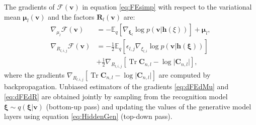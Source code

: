 \documentclass{article}
\newcommand{\E}{\mathbb{E}} %
\newcommand{\FE}{\mathcal{F}} %
\DeclareMathOperator{\Tr}{Tr} %
\newcommand{\hid}{\ensuremath{\mathbf{h}}} %
\newcommand{\vis}{\ensuremath{\mathbf{v}}} %
\newcommand{\myvec}[1]{\mbox{$\mathbf{#1}$}}
\newcommand{\myvecsym}[1]{\mbox{$\boldsymbol{#1}$}}
\newcommand{\vmu}{\mbox{$\myvecsym{\mu}$}}
\newcommand{\vxi}{\mbox{$\myvecsym{\xi}$}}
\newcommand{\vC}{\mbox{$\myvec{C}$}}
\newcommand{\vR}{\mbox{$\myvec{R}$}}
\begin{document}
\begin{bibunit}[icml2013]
The gradients of $\FE(\vis)$ in equation \eqref{eq:FEsimp} with 
respect to the variational mean $\vmu_l (\vis)$ and the factors 
$\vR_l(\vis)$ 
are:
\vspace{-2mm}
\begin{align}
\nabla_{\mu_l} \FE(\vis) 
&= -  \E_{q} \left[ \nabla_{\vxi_l} \log p(\vis| \hid(\xi) ) 
\right] + \vmu_l, \label{eq:dFEdMu} \\
\nabla_{R_{l,i,j}} \FE(\vis)
&= - \tfrac{1}{2}\E_{q} \left[ \epsilon_{l,j}
\nabla_{\xi_{l,i}} \log p(\vis| \hid(\vxi) ) 
\right] \nonumber\\
&+ \tfrac{1}{2}\nabla_{R_{l,i,j}}  \left[ \Tr \vC _{n,l}  - \log \vert \vC_{n,l} 
\vert \right], \label{eq:dFEdR}
\end{align}
where the gradients $\nabla_{R_{l,i,j}}  \left[ \Tr \vC _{n,l}  - \log \vert 
\vC_{n,l} 
\vert \right]$ are computed by backpropagation.
Unbiased estimators of the gradients \eqref{eq:dFEdMu} and 
\eqref{eq:dFEdR} are obtained jointly by 
sampling from the recognition model $\vxi \sim q(\vxi | \vis)$ (bottom-up 
pass) and updating the values of the generative model layers using 
equation \eqref{eq:HiddenGen} (top-down 
pass). 


\end{bibunit}
\end{document}
